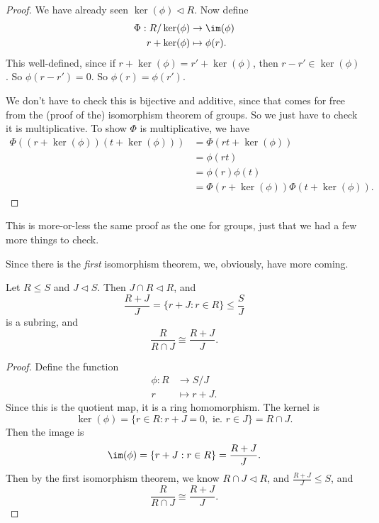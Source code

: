 \documentclass[a4paper]{article}
\begin{document}
\begin{proof}
  We have already seen $\ker(\phi) \lhd R$. Now define
  \begin{align*}
    \Phi: R/\ker(\phi) &\to \im(\phi)\\
    r + \ker(\phi) &\mapsto \phi(r).
  \end{align*}
  This well-defined, since if $r + \ker(\phi) = r' + \ker(\phi)$, then $r - r' \in \ker(\phi)$. So $\phi(r - r') = 0$. So $\phi(r) = \phi(r')$.

  We don't have to check this is bijective and additive, since that comes for free from the (proof of the) isomorphism theorem of groups. So we just have to check it is multiplicative. To show $\Phi$ is multiplicative, we have
  \begin{align*}
    \Phi((r + \ker(\phi))(t + \ker(\phi))) &= \Phi(rt + \ker(\phi)) \\
    &= \phi(rt) \\
    &= \phi(r)\phi(t) \\
    &= \Phi(r + \ker(\phi)) \Phi(t + \ker(\phi)).
  \end{align*}
\end{proof}
This is more-or-less the same proof as the one for groups, just that we had a few more things to check.

Since there is the \emph{first} isomorphism theorem, we, obviously, have more coming.

\begin{thm}
  Let $R \leq S$ and $J \lhd S$. Then $J \cap R \lhd R$, and
  \[
    \frac{R + J}{J} = \{r + J: r \in R\} \leq \frac{S}{J}
  \]
  is a subring, and
  \[
    \frac{R}{R \cap J} \cong \frac{R + J}{J}.
  \]
\end{thm}

\begin{proof}
  Define the function
  \begin{align*}
    \phi: R &\to S/J\\
    r &\mapsto r + J.
  \end{align*}
  Since this is the quotient map, it is a ring homomorphism. The kernel is
  \[
    \ker(\phi) = \{r \in R: r + J = 0,\text{ ie. } r \in J\} = R \cap J.
  \]
  Then the image is
  \[
    \im(\phi) = \{r + J: r \in R\} = \frac{R + J}{J}.
  \]
  Then by the first isomorphism theorem, we know $R \cap J \lhd R$, and $\frac{R + J}{J} \leq S$, and
  \[
    \frac{R}{R \cap J} \cong \frac{R + J}{J}.
  \]
\end{proof}
\end{document}
